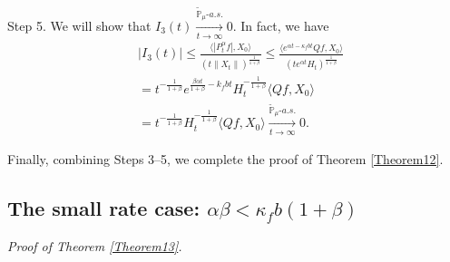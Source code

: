 \documentclass[12pt,a4paper]{amsart}
\theoremstyle{plain}
\theoremstyle{definition}
\numberwithin{equation}{section}
\begin{document}
	Step 5. We will show that $I_3(t) \xrightarrow[t\to \infty]{\tilde {\mathbb P}_\mu \text{-} a.s.} 0$.
In fact, we have
\begin{equation}\begin{split}
	&|I_3(t)|
\leq \frac{\langle |P^\alpha_tf|,X_0\rangle}{(t\|X_t\|)^{\frac{1}{1+\beta}}}
	\leq \frac{\langle e^{\alpha t - \kappa_f b t}Qf,X_0\rangle}{(te^{\alpha t} H_t)^{\frac{1}{1+\beta}}}
	\\& = t^{-\frac{1}{1+\beta}} e^{\frac{\beta \alpha t}{1+\beta} - k_fbt} H_t^{-\frac{1}{1+\beta}} \langle Qf,X_0\rangle
	\\& = t^{-\frac{1}{1+\beta}} H_t^{-\frac{1}{1+\beta}} \langle Qf,X_0\rangle
	\xrightarrow[t\to \infty]{\tilde {\mathbb P}_\mu \text{-} a.s.} 0.
\end{split}\end{equation}

	Finally, combining Steps 3--5, we complete the proof of Theorem \ref{Theorem12}.
\subsection{The small rate case: $\alpha\beta<\kappa_fb(1+\beta)$}

{\it Proof of Theorem \ref{Theorem13}.}\quad
\end{document}
